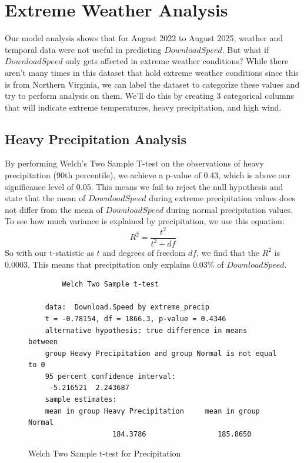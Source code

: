 \documentclass[11pt]{report}
\begin{document}
\clearpage

\section{Extreme Weather Analysis}
Our model analysis shows that for August 2022 to August 2025, weather and temporal data were not useful in predicting $DownloadSpeed$. But what if $DownloadSpeed$ only gets affected in extreme weather conditions? While there aren't many times in this dataset that hold extreme weather conditions since this is from Northern Virginia, we can label the dataset to categorize these values and try to perform analysis on them. We'll do this by creating 3 categorical columns that will indicate extreme temperatures, heavy precipitation, and high wind.

\subsection{Heavy Precipitation Analysis}

By performing Welch's Two Sample T-test on the observations of heavy precipitation (90th percentile), we achieve a p-value of 0.43, which is above our significance level of 0.05. This means we fail to reject the null hypothesis and state that the mean of $DownloadSpeed$ during extreme precipitation values does not differ from the mean of $DownloadSpeed$ during normal precipitation values. To see how much variance is explained by precipitation, we use this equation: 
\begin{equation}
    R^2 = \frac{t^2}{t^2 + df}
\end{equation}
So with our t-statistic as $t$ and degrees of freedom $df$, we find that the $R^2$ is 0.0003. This means that precipitation only explains 0.03\% of $DownloadSpeed$.

\begin{figure}[ht!]
    \centering
    \begin{verbatim}
        Welch Two Sample t-test
    
    data:  Download.Speed by extreme_precip
    t = -0.78154, df = 1866.3, p-value = 0.4346
    alternative hypothesis: true difference in means between 
    group Heavy Precipitation and group Normal is not equal to 0
    95 percent confidence interval:
     -5.216521  2.243687
    sample estimates:
    mean in group Heavy Precipitation     mean in group Normal 
                    184.3786                 185.8650 
    \end{verbatim}
    \caption{Welch Two Sample t-test for Precipitation}
    \label{fig:welch_precip}
\end{figure}
\end{document}
